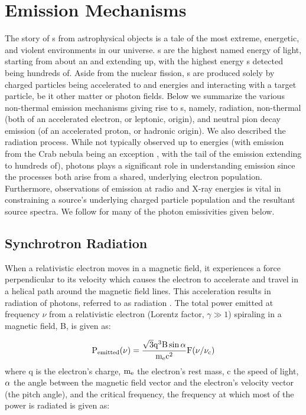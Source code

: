\section{\gam{} Emission Mechanisms }\label{gamAstr:Emiss}
The story of \gam{}s from astrophysical objects is a tale of the most extreme, energetic, and violent environments in our universe. \gam{}s are the highest named energy of light, starting from about an\mev{} and extending up, with the highest energy \gam{}s detected being hundreds of\tev{}. Aside from the  nuclear fission, \gam{}s are produced solely by charged particles being accelerated to\gev{} and\tev{} energies and interacting with a target particle, be it other matter or photon fields.  Below we summarize the various non-thermal emission mechanisms giving rise to \gam{}s, namely, \ic{} radiation, non-thermal \brems{} (both of an accelerated electron, or leptonic, origin), and neutral pion decay emission (of an accelerated proton, or hadronic origin). We also described the \sync{} radiation process. While not typically observed up to \gam{} energies (with \sync{}  emission from the Crab nebula being an exception \cite{AbdoCrab}, with the tail of the emission extending to hundreds of\mev{}), \sync{} photons plays a significant role in understanding \ic{} \gam{} emission since the processes both arise from a shared, underlying electron population. Furthermore, observations of \sync{} emission at radio and X-ray energies is vital in  constraining a source's underlying charged particle population and the resultant \gam{} source spectra. We follow \cite{Houck06} for many of the photon emissivities given below.

\subsection{Synchrotron Radiation}\label{gamAstr:sync}
When a relativistic electron moves in a magnetic field, it experiences a force perpendicular to its velocity which causes the electron to accelerate and travel in a helical path around the magnetic field lines. This acceleration results in radiation of photons, referred to as \sync{} radiation \cite{Blumenthal70,Pacholczyk70,Rybicki86,Longair11}. The total power emitted at frequency $\nu$ from a relativistic electron (Lorentz factor, $\gamma \gg 1$) spiraling in a magnetic field, B, is given as:

\begin{equation}\label{eq:syncPow}
{\rm P_{emitted}(\nu) = 
\frac{\sqrt{3} q^3 B \sin\alpha}{m_e c^2} F(\nu/\nu_c) }
\end{equation}
where q is the electron's charge,  ${\rm m_e}$ the electron's rest mass, c the speed of light,  ${\rm \alpha }$ the angle between the magnetic field vector and the electron's velocity vector (the pitch angle), and the critical frequency, the frequency at which most of the power is radiated is given as:

